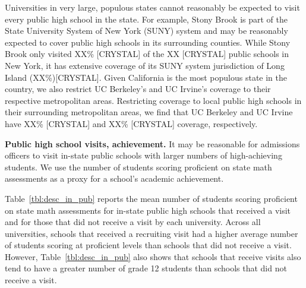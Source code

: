 \documentclass[twoside]{article}
\begin{document}
Universities in very large, populous states cannot reasonably be expected to visit every public high school in the state. For example, Stony Brook is part of the State University System of New York (SUNY) system and may be reasonably expected to cover public high schools in its surrounding counties. While Stony Brook only visited XX\% [CRYSTAL] of the XX [CRYSTAL] public schools in New York, it has extensive coverage of its SUNY system jurisdiction of Long Island (XX\%)[CRYSTAL]. Given California is the most populous state in the country, we also restrict UC Berkeley's and UC Irvine's coverage to their respective metropolitan areas. Restricting coverage to local public high schools in their surrounding metropolitan areas, we find that UC Berkeley and UC Irvine have XX\% [CRYSTAL] and XX\% [CRYSTAL] coverage, respectively.



\textbf{Public high school visits, achievement.} It may be reasonable for admissions officers to visit in-state public schools with larger numbers of high-achieving students. We use the number of students scoring proficient on state math assessments as a proxy for a school's academic achievement. 

Table~\ref{tbl:desc_in_pub} reports the mean number of students scoring proficient on state math assessments for in-state public high schools that received a visit and for those that did not receive a visit by each university. Across all universities, schools that received a recruiting visit had a higher average number of students scoring at proficient levels than schools that did not receive a visit. However, Table~\ref{tbl:desc_in_pub} also shows that schools that receive visits also tend to have a greater number of grade 12 students than schools that did not receive a visit.
\end{document}
